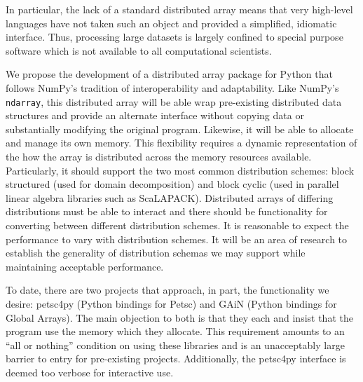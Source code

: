 \documentclass[letterpaper,11pt]{article}
\begin{document}
In particular, the lack of a standard distributed array means that very high-level 
languages have not taken such an object and provided a simplified, idiomatic interface.
Thus, processing large datasets is largely confined to special purpose software which is 
not available to all computational scientists.

We propose the development of a distributed array package for Python that follows NumPy's 
tradition of interoperability and adaptability.  Like NumPy's \texttt{ndarray}, this 
distributed array will be able wrap pre-existing distributed data structures and provide 
an alternate interface without copying data or substantially modifying the original program.  
Likewise, it 
will be able to allocate and manage its own memory.  This flexibility requires a dynamic 
representation of the how the array is distributed across the memory resources available.  
Particularly, it should support the two most common distribution schemes: block structured 
(used for domain decomposition) and block cyclic (used in parallel linear algebra libraries 
such as ScaLAPACK\cite{scalapack}).  Distributed arrays of differing distributions must be 
able to interact and there should be functionality for converting between different 
distribution schemes.  It is reasonable to expect the performance to vary with distribution 
schemes.  It will be an area of research to establish the generality of distribution 
schemas we may support while maintaining acceptable performance.

To date, there are two projects that approach, in part, the functionality we desire: 
petsc4py\cite{petsc4py-web-page} (Python bindings for Petsc\cite{petsc-user-ref}) 
and GAiN\cite{global-arrays-python} (Python bindings for Global Arrays\cite{global-arrays}).  
The main objection to both is that they each and insist that the program use the 
memory which they allocate.  This requirement amounts to an ``all or nothing'' condition
on using these libraries and is an unacceptably large barrier to entry for pre-existing 
projects.  Additionally, the petsc4py interface is deemed too verbose for interactive use.
\end{document}
